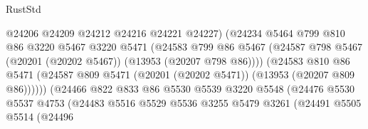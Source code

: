 \begin{lexlean}{RustStd}
\begin{coremodule}
                                      @24206
                                      @24209
                                      @24212
                                      @24216
                                      @24221
                                      @24227)
                                    (@24234
                                      @5464
                                      @799
                                      @810
                                      @86
                                      @3220
                                      @5467
                                      @3220
                                      @5471
                                      (@24583
                                        @799
                                        @86
                                        @5467
                                        (@24587
                                          @798
                                          @5467
                                          (@20201 (@20202 @5467))
                                          (@13953 (@20207 @798 @86))))
                                      (@24583
                                        @810
                                        @86
                                        @5471
                                        (@24587
                                          @809
                                          @5471
                                          (@20201 (@20202 @5471))
                                          (@13953 (@20207 @809 @86))))))
                                  (@24466
                                    @822
                                    @833
                                    @86
                                    @5530
                                    @5539
                                    @3220
                                    @5548
                                    (@24476
                                      @5530
                                      @5537
                                      @4753
                                      (@24483
                                        @5516
                                        @5529
                                        @5536
                                        @3255
                                        @5479
                                        @3261
                                        (@24491
                                          @5505
                                          @5514
                                          (@24496

\end{coremodule}
\end{lexlean}
